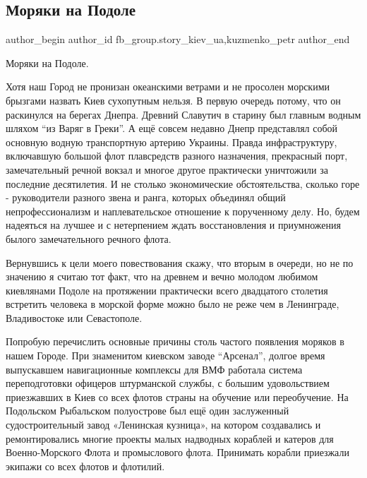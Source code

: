  
 
 
 
 
 
\subsection{Моряки на Подоле}
\label{sec:21_01_2021.fb.fb_group.story_kiev_ua.1.morjaki_na_podole}
 
\ifcmt
 author_begin
   author_id fb_group.story_kiev_ua,kuzmenko_petr
 author_end
\fi

Моряки на Подоле. 

Хотя наш Город не пронизан океанскими ветрами и не просолен морскими
брызгами назвать Киев сухопутным нельзя. В первую очередь потому, что он
раскинулся на берегах Днепра. Древний Славутич в старину был главным водным
шляхом \enquote{из Варяг в Греки}. А ещё совсем недавно Днепр представлял собой
основную водную транспортную артерию Украины. Правда инфраструктуру, включавшую
большой флот плавсредств разного назначения, прекрасный порт, замечательный
речной вокзал и многое другое практически уничтожили за последние десятилетия.
И не столько экономические обстоятельства, сколько горе - руководители разного
звена и ранга, которых объединял общий непрофессионализм и наплевательское
отношение к порученному делу. Но, будем надеяться на лучшее и с нетерпением
ждать восстановления и приумножения былого замечательного речного флота.

Вернувшись к цели моего повествования скажу, что вторым в очереди, но не по
значению я считаю тот факт, что на древнем и вечно молодом любимом киевлянами
Подоле на протяжении практически всего двадцатого столетия встретить человека в
морской форме можно было не реже чем в Ленинграде, Владивостоке или
Севастополе. 

Попробую перечислить основные причины столь частого появления
моряков в нашем Городе. При знаменитом киевском заводе \enquote{Арсенал}, долгое время
выпускавшем навигационные комплексы для ВМФ работала система переподготовки
офицеров штурманской службы, с большим удовольствием приезжавших в Киев со всех
флотов страны на обучение или переобучение. На Подольском Рыбальском
полуострове был ещё один заслуженный судостроительный завод «Ленинская
кузница», на котором создавались и ремонтировались многие проекты малых
надводных кораблей и катеров для Военно-Морского Флота и промыслового флота.
Принимать корабли приезжали экипажи со всех флотов и флотилий. 

